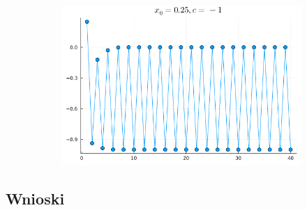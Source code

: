 \documentclass{article}
\def\v{0.47}
\begin{document}
\begin{figure}[h!]
\begin{subfigure}[b]{\v\linewidth}
		\end{subfigure}
		\begin{subfigure}[b]{\v\linewidth}
			\includegraphics[width=\linewidth]{graphs/7.png}
		\end{subfigure}
	\end{figure}
\subsection{Wnioski}
\end{document}
